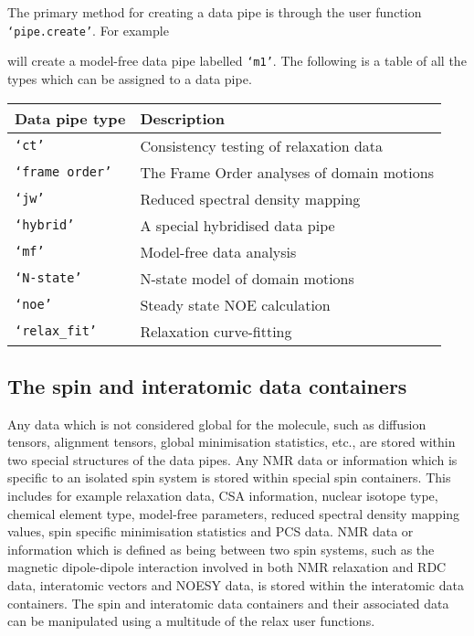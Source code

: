The primary method for creating a data pipe is through the user function \texttt{`pipe.create'}.  For example


will create a model-free data pipe labelled \texttt{`m1'}.  The following is a table of all the types which can be assigned to a data pipe.

\begin{center}
\begin{tabular}{ll}
\toprule

Data pipe type          & Description \\

\midrule

\texttt{`ct'}           & Consistency testing of relaxation data \\
\texttt{`frame order'}  & The Frame Order analyses of domain motions \\
\texttt{`jw'}           & Reduced spectral density mapping \\
\texttt{`hybrid'}       & A special hybridised data pipe \\
\texttt{`mf'}           & Model-free data analysis \\
\texttt{`N-state'}      & N-state model of domain motions \\
\texttt{`noe'}          & Steady state NOE calculation \\
\texttt{`relax\_fit'}   & Relaxation curve-fitting \\

\bottomrule
\end{tabular}
\end{center}




\subsection{The spin and interatomic data containers}

Any data which is not considered global for the molecule, such as diffusion tensors, alignment tensors, global minimisation statistics, etc., are stored within two special structures of the data pipes.  Any NMR data or information which is specific to an isolated spin system is stored within special spin containers.  This includes for example relaxation data, CSA information, nuclear isotope type, chemical element type, model-free parameters, reduced spectral density mapping values, spin specific minimisation statistics and PCS data.  NMR data or information which is defined as being between two spin systems, such as the magnetic dipole-dipole interaction involved in both NMR relaxation and RDC data, interatomic vectors and NOESY data, is stored within the interatomic data containers.  The spin and interatomic data containers and their associated data can be manipulated using a multitude of the relax user functions.


